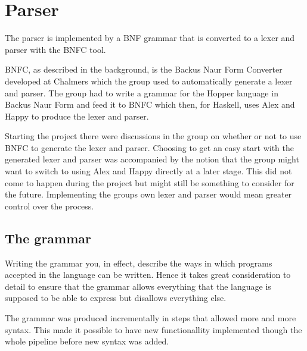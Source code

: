 \section{Parser}




The parser is implemented by a BNF grammar that is converted to a lexer and 
parser with the BNFC tool. 


BNFC, as described in the background, is the Backus Naur Form Converter developed at Chalmers which the group used to automatically generate a lexer and parser. The group had to write a grammar for the Hopper language in Backus Naur Form and feed it to BNFC which then, for Haskell, uses Alex and Happy to produce the lexer and parser.

Starting the project there were discussions in the group on whether or not to use BNFC to generate the lexer and parser. Choosing to get an easy start with the generated lexer and parser was accompanied by the notion that the group might want to switch to using Alex and Happy directly at a later stage. This did not come to happen during the project but might still be something to consider for the future. Implementing the groups own lexer and parser would mean greater control over the process.

\subsection{The grammar}

Writing the grammar you, in effect, describe the ways in which programs accepted in the language can be written. Hence it takes great consideration to detail to ensure that the grammar allows everything that the language is supposed to be able to express but disallows everything else.

The grammar was produced incrementally in steps that allowed more and more syntax. This made it possible to have new functionallity implemented though the whole pipeline before new syntax was added. 

